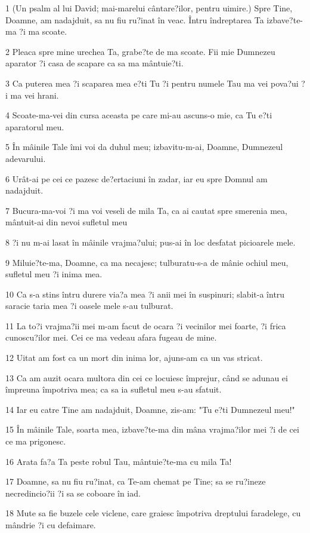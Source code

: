 \par 1 (Un psalm al lui David; mai-marelui cântare?ilor, pentru uimire.) Spre Tine, Doamne, am nadajduit, sa nu fiu ru?inat în veac. Întru îndreptarea Ta izbave?te-ma ?i ma scoate.
\par 2 Pleaca spre mine urechea Ta, grabe?te de ma scoate. Fii mie Dumnezeu aparator ?i casa de scapare ca sa ma mântuie?ti.
\par 3 Ca puterea mea ?i scaparea mea e?ti Tu ?i pentru numele Tau ma vei pova?ui ?i ma vei hrani.
\par 4 Scoate-ma-vei din cursa aceasta pe care mi-au ascuns-o mie, ca Tu e?ti aparatorul meu.
\par 5 În mâinile Tale îmi voi da duhul meu; izbavitu-m-ai, Doamne, Dumnezeul adevarului.
\par 6 Urât-ai pe cei ce pazesc de?ertaciuni în zadar, iar eu spre Domnul am nadajduit.
\par 7 Bucura-ma-voi ?i ma voi veseli de mila Ta, ca ai cautat spre smerenia mea, mântuit-ai din nevoi sufletul meu
\par 8 ?i nu m-ai lasat în mâinile vrajma?ului; pus-ai în loc desfatat picioarele mele.
\par 9 Miluie?te-ma, Doamne, ca ma necajesc; tulburatu-s-a de mânie ochiul meu, sufletul meu ?i inima mea.
\par 10 Ca s-a stins întru durere via?a mea ?i anii mei în suspinuri; slabit-a întru saracie taria mea ?i oasele mele s-au tulburat.
\par 11 La to?i vrajma?ii mei m-am facut de ocara ?i vecinilor mei foarte, ?i frica cunoscu?ilor mei. Cei ce ma vedeau afara fugeau de mine.
\par 12 Uitat am fost ca un mort din inima lor, ajuns-am ca un vas stricat.
\par 13 Ca am auzit ocara multora din cei ce locuiesc împrejur, când se adunau ei împreuna împotriva mea; ca sa ia sufletul meu s-au sfatuit.
\par 14 Iar eu catre Tine am nadajduit, Doamne, zis-am: "Tu e?ti Dumnezeul meu!"
\par 15 În mâinile Tale, soarta mea, izbave?te-ma din mâna vrajma?ilor mei ?i de cei ce ma prigonesc.
\par 16 Arata fa?a Ta peste robul Tau, mântuie?te-ma cu mila Ta!
\par 17 Doamne, sa nu fiu ru?inat, ca Te-am chemat pe Tine; sa se ru?ineze necredincio?ii ?i sa se coboare în iad.
\par 18 Mute sa fie buzele cele viclene, care graiesc împotriva dreptului faradelege, cu mândrie ?i cu defaimare.
